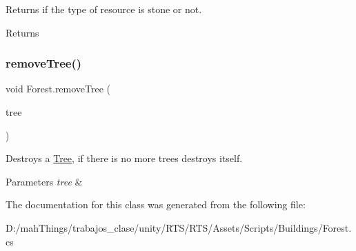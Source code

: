 Returns if the type of resource is stone or not. 

\begin{DoxyReturn}{Returns}

\end{DoxyReturn}
\mbox{\label{class_forest_ac905399d43a853c201fefd4c055afcec}} 
\subsubsection{\texorpdfstring{remove\+Tree()}{removeTree()}}
{\footnotesize\ttfamily void Forest.\+remove\+Tree (\begin{DoxyParamCaption}\item[{\mbox{\hyperlink{class_forest_tree}{Forest\+Tree}}}]{tree }\end{DoxyParamCaption})}



Destroys a \mbox{\hyperlink{class_tree}{Tree}}, if there is no more trees destroys itself. 


\begin{DoxyParams}{Parameters}
{\em tree} & \\
\hline
\end{DoxyParams}


The documentation for this class was generated from the following file\+:\begin{DoxyCompactItemize}
\item 
D\+:/mah\+Things/trabajos\+\_\+clase/unity/\+R\+T\+S/\+R\+T\+S/\+Assets/\+Scripts/\+Buildings/Forest.\+cs\end{DoxyCompactItemize}
